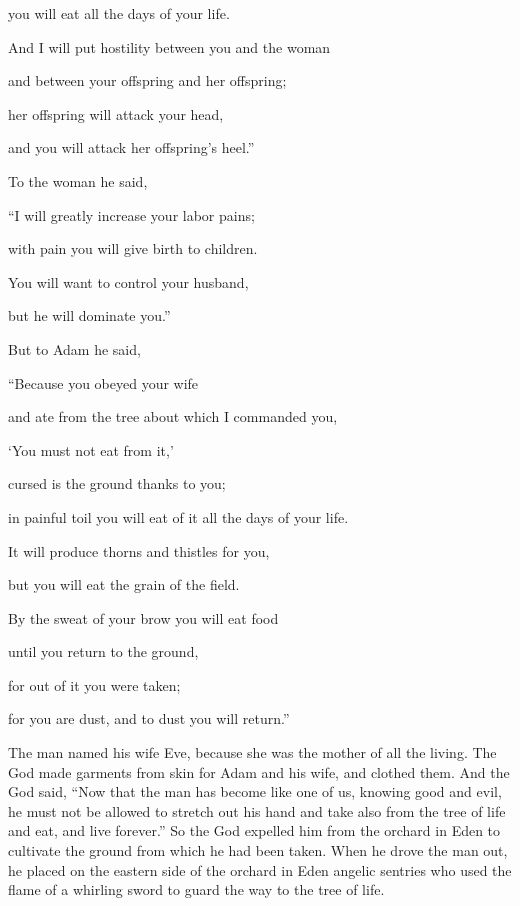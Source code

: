 {you will eat
all
the days
of your life.
\par }{\Q {}And I will put
hostility
between
you and the woman
\par }{\Q and between
your offspring
and her offspring;
\par }{\Q her offspring will attack
your head,
\par }{\Q and you
will attack
her offspring’s heel.”
\par }{\Q {}To
the woman
he said,
\par }{\Q “I will greatly
increase
your labor pains;
\par }{\Q with pain
you will give birth
to children.
\par }{\Q You will want
to control your husband,
\par }{\Q but he will dominate you.”
\par }{\Q {}But to Adam
he said,
\par }{\Q “Because
you obeyed
your wife
\par }{\Q and ate
from
the tree
about which
I commanded
you,
\par }{\Q ‘You must not
eat
from
it,’
\par }{\Q cursed
is the ground
thanks to you;

\par }{\Q in painful
toil
you will eat
of it all
the days
of your life.
\par }{\Q {}It will produce
thorns
and thistles
for you,
\par }{\Q but you will eat
the grain
of the field.
\par }{\Q {}By the sweat
of your brow
you will eat
food
\par }{\Q until
you return
to
the ground,
\par }{\Q for
out
of it
you were taken;
\par }{\Q for
you
are dust,
and to
dust
you will return.”
\par }{\PP {}The man
named
his wife
Eve,
because
she
was the mother
of all
the living.
The
{}
God
made
garments
from skin
for Adam
and his wife,
and clothed them.
And the
{}
God
said,
“Now
that the man
has become
like one
of us, knowing
good
and evil,
he must not be allowed
to stretch
out his hand
and take
also
from the tree
of life
and eat,
and live
forever.”
So
the {}
God
expelled
him from the orchard
in Eden
to cultivate
the ground
from which
he had been taken.
When he drove
the
man
out, he placed
on the eastern
side of the orchard
in Eden
angelic sentries
who used the flame
of a whirling
sword
to guard
the
way
to the tree
of life.

}
